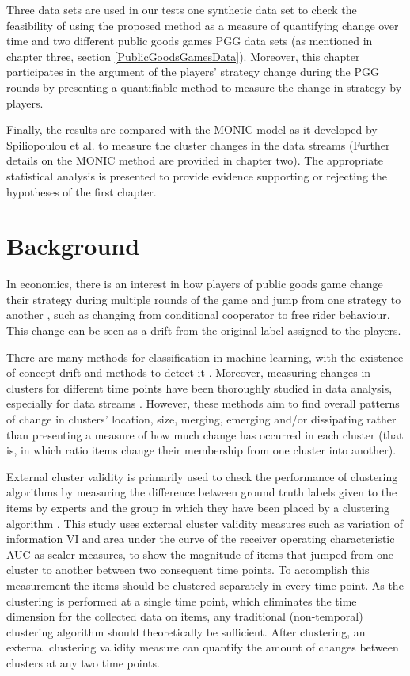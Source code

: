  Three data sets are used in our tests one synthetic data set to check the feasibility of using the proposed method as a measure of quantifying change over time and two different public goods games PGG data sets (as mentioned in chapter three, section  \ref{PublicGoodsGamesData}). Moreover, this chapter participates in the argument of the players' strategy change during the PGG rounds \cite{Chaudhuri2010, Fischbacher2009} by presenting a quantifiable method to measure the change in strategy by players.
 
 
 Finally, the results are compared with the MONIC model as it developed by Spiliopoulou et al. \cite{Spiliopoulou2006} to measure the cluster changes in the data streams (Further details on the MONIC method are provided in chapter two). The appropriate statistical analysis is presented to provide evidence supporting or rejecting the hypotheses of the first chapter.
 
 \section{Background}
 In economics, there is an interest in how players of public goods game change their strategy during multiple rounds of the game and jump from one strategy to another \cite{Fischbacher2010}, such as changing from conditional cooperator to free rider behaviour. This change can be seen as a drift from the original label assigned to the players.
 
 There are many methods for classification in machine learning, with the existence of concept drift \cite{Elwell2011,Garnett2008,Xiaofeng2014} and methods to detect it \cite{Baena-Garcia2006,Harel2014}. Moreover, measuring changes in clusters for different time points have been thoroughly studied in data analysis, especially for data streams \cite{Ntoutsi2011,Spiliopoulou2013,Yang2011}. However, these methods aim to find overall patterns of change in clusters' location, size, merging, emerging and/or dissipating rather than presenting a measure of how much change has occurred in each cluster (that is, in which ratio items change their membership from one cluster into another).
 
 External cluster validity is primarily used to check the performance of clustering algorithms by measuring the difference between ground truth labels given to the items by experts and the group in which they have been placed by a clustering algorithm \cite{Halkidi2002a}. This study uses external cluster validity measures such as variation of information \cite{Meila2003} VI and area under the curve of the receiver operating characteristic AUC \cite{Bradley1997} as scaler measures, to show the magnitude of items that jumped from one cluster to another between two consequent time points. To accomplish this measurement the items should be clustered separately in every time point. As the clustering is performed at a single time point, which eliminates the time dimension for the collected data on items, any traditional (non-temporal) clustering algorithm should theoretically be sufficient. After clustering, an external clustering validity measure can quantify the amount of changes between clusters at any two time points.
 
